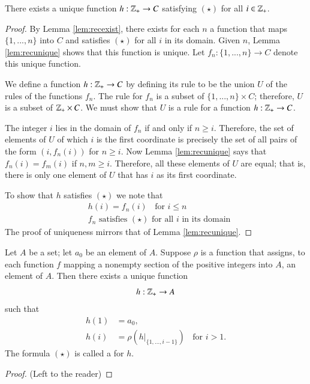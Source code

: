 \documentclass[12pt, a4paper, oneside, openright, titlepage]{book}
\begin{document}
\begin{appendices}
    \begin{theorem}
        There exists a unique function $h:\mathbb Z_+\rightarrow C$ satisfying $(\star)$ for all $i \in \mathbb Z_+$.
    \end{theorem}
    \begin{proof}
        By Lemma \ref{lem:recexist}, there exists for each $n$ a function that maps $\{1,...,n\}$ into $C$ and satisfies $(\star)$ for all $i$ in its domain. Given $n$, Lemma \ref{lem:recunique} shows that this function is unique. Let $f_n:\{1,...,n\}\rightarrow C$ denote this unique function.


        We define a function $h:\mathbb Z_+\rightarrow C$ by defining its rule to be the union $U$ of the rules of the functions $f_n$. The rule for $f_n$ is a subset of $\{1,...,n\}\times C$; therefore, $U$ is a subset of $\mathbb Z_+\times C$. We must show that $U$ is a rule for a function $h:\mathbb Z_+\rightarrow C$.

        The integer $i$ lies in the domain of $f_n$ if and only if $n \geq i$. Therefore, the set of elements of $U$ of which $i$ is the first coordinate is precisely the set of all pairs of the form $(i,f_n(i))$ for $n \geq i$. Now Lemma \ref{lem:recunique} says that $f_n(i) = f_m(i)$ if $n,m \geq i$. Therefore, all these elements of $U$ are equal; that is, there is only one element of $U$ that has $i$ as its first coordinate.

        To show that $h$ satisfies $(\star)$ we note that \begin{align*}
            &h(i) = f_n(i)\;\;\text{ for } i \leq n \\
            &f_n\text{ satisfies $(\star)$ for all $i$ in its domain}
        \end{align*}
        The proof of uniqueness mirrors that of Lemma \ref{lem:recunique}.
    \end{proof}

    \begin{theorem}
        Let $A$ be a set; let $a_0$ be an element of $A$. Suppose $\rho$ is a function that assigns, to each function $f$ mapping a nonempty section of the positive integers into $A$, an element of $A$. Then there exists a unique function \begin{equation*}
            h:\mathbb Z_+\rightarrow A
        \end{equation*}
        such that \begin{equation*}
            \begin{array}{cl} h(1) &= a_0, \\
                h(i) &= \rho(h\rvert_{\{1,...,i-1\}})\;\;\text{ for } i > 1.
            \end{array} \tag{$(\star)$}
        \end{equation*}
        The formula $(\star)$ is called a  for $h$. 
    \end{theorem}
    \begin{proof}
        (Left to the reader)
    \end{proof}



\end{appendices}
\end{document}
